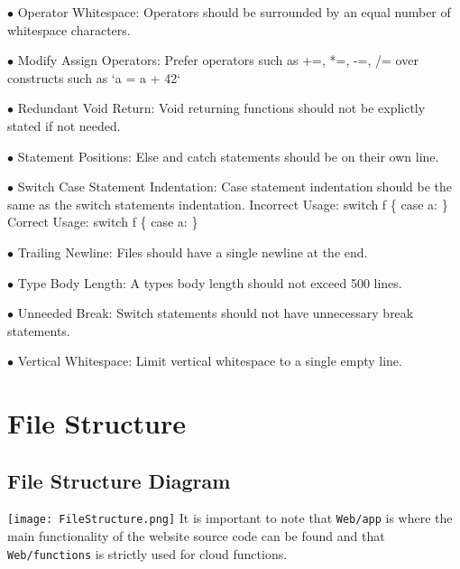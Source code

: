\documentclass[12pt]{article}
\newcommand\tab[1][0.5cm]{\hspace*{#1}}
\begin{document}
 \item[$\bullet$] Operator Whitespace: \newline Operators should be surrounded by an equal number of whitespace characters.
  \item[$\bullet$] Modify Assign Operators: \newline Prefer operators such as +=, *=, -=, /= over constructs such as `a = a + 42`
  \item[$\bullet$] Redundant Void Return: \newline  Void returning functions should not be explictly stated if not needed.
  \item[$\bullet$] Statement Positions: \newline  Else and catch statements should be on their own line.
  \item[$\bullet$] Switch Case Statement Indentation: \newline  Case statement indentation should be the same as the switch statements indentation. \newline
 Incorrect Usage:\newline
  switch f \{ \newline
    \tab case a: \newline
  \} \newline
  Correct Usage: \newline
  switch f \{ \newline
  case a: \newline
  \} \newline
 \item[$\bullet$] Trailing Newline: \newline Files should have a single newline at the end.
 \item[$\bullet$] Type Body Length: \newline  A types body length should not exceed 500 lines.
 \item[$\bullet$] Unneeded Break: \newline Switch statements should not have unnecessary break statements.
 \item[$\bullet$] Vertical Whitespace: \newline Limit vertical whitespace to a single empty line.
 \newpage
  
\center\section{File Structure}
  \subsection{File Structure Diagram}
  \flushleft 
  \texttt{[image: FileStructure.png]}
  It is important to note that \texttt{Web/app} is where the main functionality of the website source code can be found and that \texttt{Web/functions} is strictly used for cloud functions.
  
\end{document}
